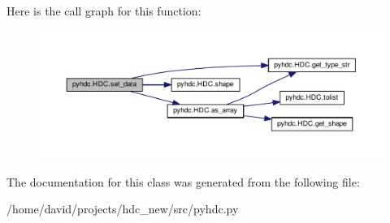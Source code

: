 Here is the call graph for this function\+:
\nopagebreak
\begin{figure}[H]
\begin{center}
\leavevmode
\includegraphics[width=350pt]{a00002_a42b5d61d63e3ff6c9a0824eeaa5af88d_cgraph}
\end{center}
\end{figure}




The documentation for this class was generated from the following file\+:\begin{DoxyCompactItemize}
\item 
/home/david/projects/hdc\+\_\+new/src/pyhdc.\+py\end{DoxyCompactItemize}
